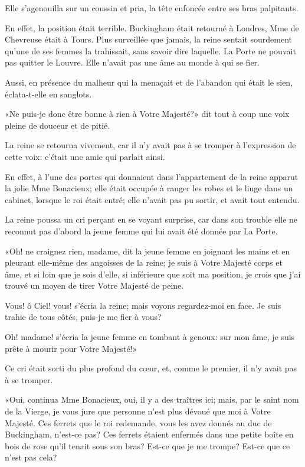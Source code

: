 Elle s'agenouilla sur un coussin et pria, la tête enfoncée entre ses bras palpitants. 

En effet, la position était terrible. Buckingham était retourné à Londres, Mme de Chevreuse était à Tours. Plus surveillée que jamais, la reine sentait sourdement qu'une de ses femmes la trahissait, sans savoir dire laquelle. La Porte ne pouvait pas quitter le Louvre. Elle n'avait pas une âme au monde à qui se fier. 

Aussi, en présence du malheur qui la menaçait et de l'abandon qui était le sien, éclata-t-elle en sanglots. 

«Ne puis-je donc être bonne à rien à Votre Majesté?» dit tout à coup une voix pleine de douceur et de pitié. 

La reine se retourna vivement, car il n'y avait pas à se tromper à l'expression de cette voix: c'était une amie qui parlait ainsi. 

En effet, à l'une des portes qui donnaient dans l'appartement de la reine apparut la jolie Mme Bonacieux; elle était occupée à ranger les robes et le linge dans un cabinet, lorsque le roi était entré; elle n'avait pas pu sortir, et avait tout entendu. 

La reine poussa un cri perçant en se voyant surprise, car dans son trouble elle ne reconnut pas d'abord la jeune femme qui lui avait été donnée par La Porte. 

«Oh! ne craignez rien, madame, dit la jeune femme en joignant les mains et en pleurant elle-même des angoisses de la reine; je suis à Votre Majesté corps et âme, et si loin que je sois d'elle, si inférieure que soit ma position, je crois que j'ai trouvé un moyen de tirer Votre Majesté de peine. 

\speak  Vous! ô Ciel! vous! s'écria la reine; mais voyons regardez-moi en face. Je suis trahie de tous côtés, puis-je me fier à vous? 

\speak  Oh! madame! s'écria la jeune femme en tombant à genoux: sur mon âme, je suis prête à mourir pour Votre Majesté!» 

Ce cri était sorti du plus profond du cœur, et, comme le premier, il n'y avait pas à se tromper. 

«Oui, continua Mme Bonacieux, oui, il y a des traîtres ici; mais, par le saint nom de la Vierge, je vous jure que personne n'est plus dévoué que moi à Votre Majesté. Ces ferrets que le roi redemande, vous les avez donnés au duc de Buckingham, n'est-ce pas? Ces ferrets étaient enfermés dans une petite boîte en bois de rose qu'il tenait sous son bras? Est-ce que je me trompe? Est-ce que ce n'est pas cela? 


